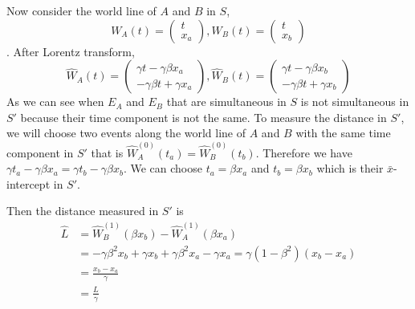 \documentclass[12pt]{article}
\begin{document}
Now consider the world line of $A$ and $B$ in $S$,  
$$W_A(t) = \begin{pmatrix}
	t \\ x_a
\end{pmatrix},  
W_B(t) =  \begin{pmatrix}
t \\  x_b
\end{pmatrix}$$. After Lorentz transform, $$
\widehat{W}_A(t) = \begin{pmatrix}
 \gamma t - \gamma \beta x_a \\
 - \gamma\beta t + \gamma x_a
\end{pmatrix},
\widehat{W}_B(t) = \begin{pmatrix}
	\gamma t - \gamma \beta x_b \\
	- \gamma\beta t + \gamma x_b
\end{pmatrix}
$$
As we can see when $E_A$ and $E_B$ that are simultaneous in $S$ is not simultaneous in $S'$ because their time component is not the same. To measure the distance in $S'$, we will choose two events along the world line of $A$ and $B$ with the same time component in $S'$ that is $\widehat{W}_A^{(0)}(t_a) = \widehat{W}_B^{(0)}(t_b)$. Therefore we have $\gamma t_a  -  \gamma\beta x_a = \gamma t_b - \gamma \beta x_b$. We can choose $t_a = \beta x_a$ and $t_b = \beta x_b$ which is their  $\bar{x}$-intercept in $S'$.

Then the distance measured in $S'$ is $$\begin{aligned}
\widehat{L} & =  \widehat{W}_B^{(1)}(\beta x_b) - \widehat{W}_A^{(1)}(\beta x_a)\\
   & = -\gamma\beta^2 x_b + \gamma x_b + \gamma \beta^2 x_a - \gamma x_a  = \gamma(1 - \beta^2)(x_b - x_a) \\
   &= \frac{x_b - x_a}{\gamma}\\
   &= \frac{L}{\gamma}
\end{aligned}$$
\end{document}

